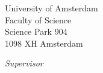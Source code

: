 \begin{center}
University of Amsterdam\\
Faculty of Science\\
Science Park 904\\
1098 XH Amsterdam

\vspace{2cm}

\emph{Supervisor}\\

\theSupervisor

\vspace{0.25cm}

\theInstitute

\vspace{1.0cm}

\theDate

\end{center}
\newpage
